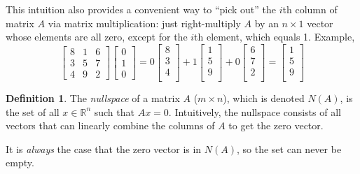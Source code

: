 \documentclass[12pt]{article}
\theoremstyle{plain}
\theoremstyle{definition}
\newtheorem{defn}[thm]{Definition}
\theoremstyle{remark}
\begin{document}
This intuition also provides a convenient way to ``pick out'' the $i$th column of matrix $A$ via matrix multiplication: just right-multiply $A$ by an $n \times 1$ vector whose elements are all zero, except for the $i$th element, which equals 1. Example,
\[
  \begin{bmatrix} 
  8 & 1 & 6 \\
  3 & 5 & 7 \\
  4 & 9 & 2 
  \end{bmatrix} 
  \begin{bmatrix} 
  0 \\ 1 \\ 0 
  \end{bmatrix} 
  = 0  
  \begin{bmatrix} 8 \\ 3 \\ 4 \\ \end{bmatrix} 
  + 1  \begin{bmatrix} 1 \\ 5 \\ 9 \\ \end{bmatrix} 
  + 0  \begin{bmatrix} 6 \\ 7 \\ 2 \\ \end{bmatrix} 
  = 
  \begin{bmatrix} 1 \\ 5 \\ 9 \\ \end{bmatrix} 
\]


\begin{defn} 
The \emph{nullspace} of a matrix $A$ ($m\times n$), which is denoted $N(A)$, is the set of all $x \in \mathbb{R}^n$ such that $Ax=0$. Intuitively, the nullspace consists of all vectors that can linearly combine the columns of $A$ to get the zero vector. 

It is \emph{always} the case that the zero vector is in $N(A)$, so the set can never be empty. 
\end{defn}






\end{document}
